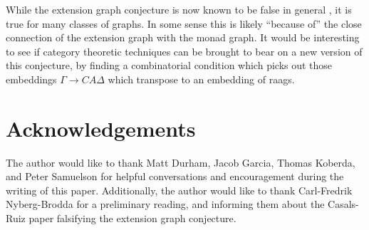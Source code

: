 \documentclass[12pt]{article}
\theoremstyle{definition}
\theoremstyle{theorem}
\begin{document}
While the extension graph conjecture is now known to be false in general
\cite{casals-ruizEmbedddingsPartiallyCommutative2013}, it is true for 
many classes of graphs. In some sense this is likely ``because of'' the close 
connection of the extension graph with the monad graph. It would be interesting 
to see if category theoretic techniques can be brought to bear on a new version 
of this conjecture, by finding a combinatorial condition which picks out those 
embeddings $\Gamma \to CA \Delta$ which transpose to an embedding of raags.

\section*{Acknowledgements}

The author would like to thank Matt Durham, Jacob Garcia, Thomas Koberda, and 
Peter Samuelson for helpful conversations and encouragement during the 
writing of this paper. Additionally, the author would like to thank 
Carl-Fredrik Nyberg-Brodda for a preliminary reading, and informing them 
about the Casals-Ruiz paper falsifying the extension graph conjecture.


\newpage


\end{document}
